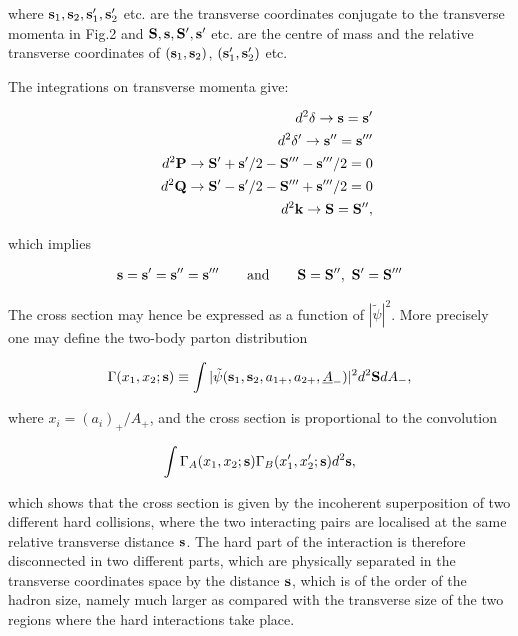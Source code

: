 \documentclass{ws-rv9x6}
\begin{document}
\noindent where $\bf s_{\rm 1}, s_{\rm 2}, s_{\rm 1}', s_{\rm 2}'$ etc. are the transverse coordinates conjugate to the transverse momenta in Fig.2 and $\bf S, s, S', s'$ etc. are the centre of mass and the relative transverse coordinates of $\bf (s_{\rm 1}, s_{\rm 2})$, $\bf (s_{\rm 1}', s_{\rm 2}')$ etc. 

The integrations on transverse momenta give:

\begin{eqnarray}
&&d^2\bf\delta\to s=s'\nonumber\\
&&d^2\bf\delta'\to s''=s'''\nonumber\\
&&d^2\bf P\to S'+s'/{\rm 2}-S'''-s'''/{\rm 2}={\rm 0}\nonumber\\
&&d^2\bf Q\to S'-s'/{\rm 2}-S'''+s'''/{\rm 2}={\rm 0}\nonumber\\
&&d^2\bf k\to S=S'',
\end{eqnarray}

\noindent which implies 

\begin{eqnarray}
\bf s=s'=s''=s'''\qquad{\rm and}\qquad S=S'',\ S'=S'''
\end{eqnarray}

\noindent The cross section may hence be expressed as a function of $|\tilde\psi|^2$. More precisely one may define the two-body parton distribution 

\begin{eqnarray}
\Gamma(x_1,x_2;{\bf s})\equiv\int|\tilde\psi({\bf s}_{1},{\bf s}_{2},a_{1+},a_{2+},\underline A_-)|^2d^2{\bf S}dA_-,
\end{eqnarray}

\noindent where $x_i=(a_i)_+/A_+$, and the cross section is proportional to the convolution

\begin{eqnarray}
\int\Gamma_A(x_1,x_2;{\bf s})\Gamma_B(x_1',x_2';{\bf s})d^2{\bf s},
\end{eqnarray}

\noindent which shows that the cross section is given by the incoherent superposition of two different hard collisions, where the two interacting pairs are localised at the same relative transverse distance $\bf s$. The hard part of the interaction is therefore disconnected in two different parts, which are physically separated in the transverse coordinates space by the distance $\bf s$, which is of the order of the hadron size, namely much larger as compared with the transverse size of the two regions where the hard interactions take place. 
\end{document}
